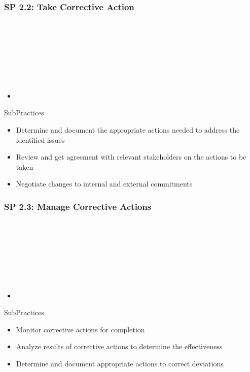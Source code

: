 \documentclass[accentcolor=tud1b]{tudbeamer}
\newcommand{\strong}[1]{\textaccentcolor{\textsf{\textbf{#1}}}}
\newenvironment*{tframe}[1][]{%
	\begin{frame}
	\ifnum\Level=2
		\frametitle{\insertsectionhead\\\strong{#1}}
	\fi\ifnum\Level=3
		\frametitle{\insertsectionhead\\\strong{\insertsubsectionhead} \textnormal{#1}}
	\fi\ifnum\Level=4
		\frametitle{\insertsubsectionhead\\\strong{\insertsubsubsectionhead} #1}
	\fi
}{%
	\end{frame}
}
\begin{document}
\subsubsection{SP 2.2: Take Corrective Action}
\begin{tframe}
	\begin{itemize}
		\item 
	\end{itemize}
	\begin{block}{SubPractices}
		\begin{itemize}
		  \item Determine and document the appropriate actions needed to address the identified issues
		  \item Review and get agreement with relevant stakeholders on the actions to be taken
		  \item Negotiate changes to internal and external commitments
		\end{itemize}
	\end{block}
\end{tframe}

\subsubsection{SP 2.3: Manage Corrective Actions}
\begin{tframe}
	\begin{itemize}
		\item 
	\end{itemize}
	\begin{block}{SubPractices}
		\begin{itemize}
		  \item Monitor corrective actions for completion
		  \item Analyze results of corrective actions to determine the effectiveness
		  \item Determine and document appropriate actions to correct deviations
		\end{itemize}
	\end{block}
\end{tframe}

\end{document}
